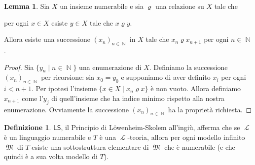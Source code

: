 \documentclass[12pt,a4paper]{report}
\theoremstyle{definition}
\newtheorem{defn}[teo]{Definizione}  %
\newtheorem{lemma}[teo]{Lemma}  %
\theoremstyle{num.custom-title}
\DeclareMathOperator{\LL}{\mathcal{L}}
\DeclareMathOperator{\N}{\mathbb{N}}
\DeclareMathOperator{\M}{\mathfrak{M}}
\newcommand{\LS}{\ensuremath{\mathsf{LS}}\xspace}
\begin{document}
\begin{lemma}\label{DC_num}
Sia $X$ un insieme numerabile e sia $\varrho$ una relazione su $X$ tale che 
\begin{center}
per ogni $x \in X$ esiste $y \in X$ tale che $x \varrho y$.
\end{center}
Allora esiste una successione $(x_n)_{n \in \N}$ in $X$ tale che $x_n \varrho x_{n+1}$ per ogni $n \in \N$.
\begin{proof}
Sia $\{y_n \mid n \in \N\}$ una enumerazione di $X$. Definiamo la successione $(x_n)_{n \in \N}$ per ricorsione: sia $x_0 = y_0$ e supponiamo di aver definito $x_i$ per ogni $i < n+1$. Per ipotesi l'insieme $\{x \in X \mid x_n \varrho x\}$ è non vuoto. Allora definiamo $x_{n+1}$ come l'$y_j$ di quell'insieme che ha indice minimo rispetto alla nostra enumerazione. Ovviamente la successione $(x_n)_{n \in \N}$ ha la proprietà richiesta.
\end{proof}
\end{lemma}

\begin{defn}
\LS, il Principio di Löwenheim-Skolem all'ingiù, afferma che se $\LL$ è un linguaggio numerabile e $T$ è una $\LL$-teoria, allora per ogni modello infinito $\M$ di $T$ esiste una sottostruttura elementare di $\M$ che è numerabile (e che quindi è a sua volta modello di $T$).
\end{defn}
\end{document}
